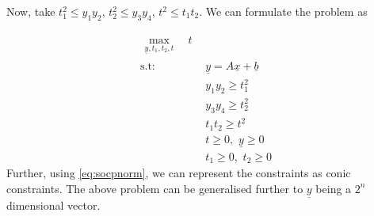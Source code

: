 \documentclass{tufte-handout}
\theoremstyle{remark}
\renewcommand{\vec}[1]{\underline{#1}}
\newcommand\twospace{\,\,}
\begin{document}
Now, take $t_1^2 \leq y_1y_2$, $t_2^2 \leq y_3y_4$, $t^2\leq t_1t_2$. We can formulate the problem as

\begin{align}
    \begin{split}
        \max_{\vec{y},t_1,t_2,t}\, &\twospace t
    \end{split}\\ 
    \text{s.t:}
    \twospace & \vec{y} = A\vec{x}+\vec{b}\\
    & y_1y_2\geq t_1^2 \nonumber\\
    & y_3y_4\geq t_2^2 \nonumber\\    
    & t_1t_2\geq t^2 \nonumber\\       
    &t\geq 0, \twospace\vec{y}\geq 0 \nonumber\\
    &t_1\geq 0,\twospace t_2\geq 0\nonumber
\end{align}
Further, using \eqref{eq:socpnorm}, we can represent the constraints as conic constraints. The above problem can be generalised further to $\vec{y}$ being a $2^n$ dimensional vector.
\end{document}
